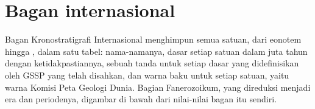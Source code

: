 \section{Bagan internasional}\label{sec:b1:stratigraphic-scale:chart}

Bagan Kronostratigrafi Internasional menghimpun semua satuan, dari eonotem hingga , dalam satu tabel: nama-namanya, dasar setiap satuan dalam juta tahun dengan ketidakpastiannya, sebuah tanda untuk setiap dasar yang didefinisikan oleh GSSP yang telah disahkan, dan warna baku untuk setiap satuan, yaitu warna Komisi Peta Geologi Dunia. Bagian Fanerozoikum, yang direduksi menjadi era dan periodenya, digambar di bawah dari nilai-nilai bagan itu sendiri.

